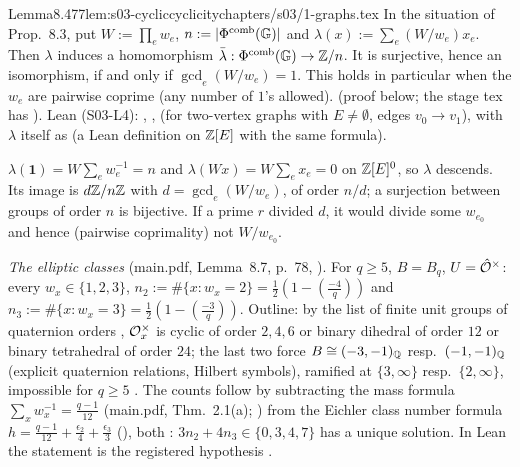 \begin{quoted}{Lemma}{8.4}{77}{lem:s03-cyclic}{cyclicity}{chapters/s03/1-graphs.tex}\label{rpt:lem:s03-cyclic}
In the situation of Prop.~8.3, put $W:=\prod_ew_e$, $n:=|\Phi^{\mathrm{comb}}(\mathbb{G})|$ and $\lambda(x):=\sum_e(W/w_e)x_e$. Then
$\lambda$ induces a homomorphism $\bar\lambda:\Phi^{\mathrm{comb}}(\mathbb{G})\to\mathbb{Z}/n$. It is surjective, hence an isomorphism, if and only if
$\gcd_e(W/w_e)=1$. This holds in particular when the $w_e$ are pairwise coprime (any number of $1$'s allowed). \stproved{} (proof below;
the stage tex has \sttoprove). Lean (S03-L4): ,
,  \stformal{}
(for two-vertex graphs with $E\ne\emptyset$, edges $v_0\to v_1$), with $\lambda$ itself as  \stformal{} (a Lean definition on $\mathbb{Z}[E]$ with the
same formula).
\end{quoted}
\begin{outline}
$\lambda(\mathbf1)=W\sum_ew_e^{-1}=n$ and $\lambda(Wx)=W\sum_ex_e=0$ on $\mathbb{Z}[E]^0$, so $\lambda$ descends. Its image is $d\mathbb{Z}/n\mathbb{Z}$ with
$d=\gcd_e(W/w_e)$, of order $n/d$; a surjection between groups of order $n$ is bijective. If a prime $r$ divided $d$, it would divide some
$w_{e_0}$ and hence (pairwise coprimality) not $W/w_{e_0}$. \stproved
\end{outline}

\noindent\emph{The elliptic classes} (main.pdf, Lemma~8.7, p.~78, \stpmc). For $q\ge5$, $B=B_q$, $U=\hat{\mathcal{O}}^\times$: every $w_x\in\{1,2,3\}$,
$n_2:=\#\{x:w_x=2\}=\frac12(1-(\frac{-4}q))$ and $n_3:=\#\{x:w_x=3\}=\frac12(1-(\frac{-3}q))$. Outline: by the list of finite unit groups of
quaternion orders \cite[Thm~11.5.14, p.~176]{Vo} \stcited, $\mathcal{O}_x^\times$ is cyclic of order $2,4,6$ or binary dihedral of order $12$ or binary
tetrahedral of order $24$; the last two force $B\cong(-3,-1)_{\mathbb{Q}}$ resp.\ $(-1,-1)_{\mathbb{Q}}$ (explicit quaternion relations, Hilbert symbols), ramified at
$\{3,\infty\}$ resp.\ $\{2,\infty\}$, impossible for $q\ge5$ \stproved. The counts follow by subtracting the mass formula
$\sum_xw_x^{-1}=\frac{q-1}{12}$ (main.pdf, Thm.~2.1(a); \cite[Thm~25.1.1, p.~415]{Vo}) from the Eichler class number formula
$h=\frac{q-1}{12}+\frac{\epsilon_2}4+\frac{\epsilon_3}3$ (\cite[Thm~30.1.5, p.~543]{Vo}), both \stcited: $3n_2+4n_3\in\{0,3,4,7\}$ has a unique
solution. In Lean the statement is the registered hypothesis .

